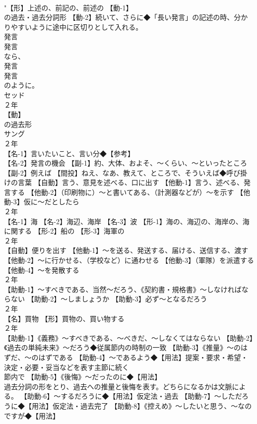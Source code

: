 \documentclass[8pt]{extreport}
\begin{document}
\begin{CJK}{UTF8}{min}
\\	"【形】上述の、前記の、前述の 【動-1】
\\	の過去・過去分詞形 【動-2】続いて、さらに◆「長い発言」の記述の時、分かりやすいように途中に区切りとして入れる。
\\	発言 
\\	発言 
\\	なら、
\\	発言 
\\	発言 
\\	のように。 
\\	セッド
\\	２年	
\\	【動】
\\	の過去形 
\\	サング
\\	２年	
\\	【名-1】言いたいこと、言い分◆【参考】
\\	【名-2】発言の機会 【副-1】約、大体、およそ、～くらい、～といったところ 【副-2】例えば 【間投】ねえ、なあ、教えて、ところで、そういえば◆呼び掛けの言葉 【自動】言う、意見を述べる、口に出す 【他動-1】言う、述べる、発言する 【他動-2】（印刷物に）～と書いてある、（計測器などが）～を示す 【他動-3】仮に～だとしたら
\\	２年	
\\	【名-1】海 【名-2】海辺、海岸 【名-3】波 【形-1】海の、海辺の、海岸の、海に関する 【形-2】船の 【形-3】海軍の
\\	２年	
\\	【自動】便りを出す 【他動-1】～を送る、発送する、届ける、送信する、渡す 【他動-2】～に行かせる、（学校など）に通わせる 【他動-3】（軍隊）を派遣する 【他動-4】～を発散する
\\	２年	
\\	【助動-1】～すべきである、当然～だろう、《契約書・規格書》～しなければならない 【助動-2】～しましょうか 【助動-3】必ず～となるだろう
\\	２年	
\\	【名】買物 【形】買物の、買い物する
\\	２年	
\\	【助動-1】《義務》～すべきである、～べきだ、～しなくてはならない 【助動-2】《過去の単純未来》～だろう◆従属節内の時制の一致 【助動-3】《推量》～のはずだ、～のはずである 【助動-4】～であるよう◆【用法】提案・要求・希望・決定・必要・妥当などを表す主節に続く 
\\	節内で 【助動-5】《後悔》～だったのに◆【用法】
\\	過去分詞の形をとり、過去への推量と後悔を表す。どちらになるかは文脈による。 【助動-6】～するだろうに◆【用法】仮定法・過去 【助動-7】～しただろうに◆【用法】仮定法・過去完了 【助動-8】《控えめ》～したいと思う、～なのですが◆【用法】

\end{CJK}
\end{document}
